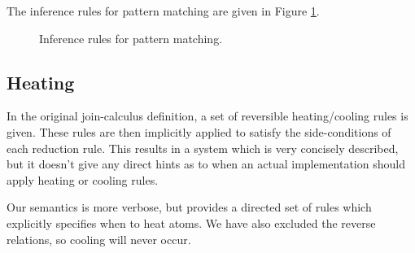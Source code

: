 The inference rules for pattern matching are given in Figure \ref{fig:rule:pat}.

\begin{figure}
\caption{Inference rules for pattern matching.} \label{fig:rule:pat}
\end{figure}

\subsection{Heating}
In the original join-calculus definition, a set of reversible heating/cooling
rules is given. These rules are then implicitly applied to satisfy the
side-conditions of each reduction rule. This results in a system which is very
concisely described, but it doesn't give any direct hints as to when an actual
implementation should apply heating or cooling rules.

Our semantics is more verbose, but provides a directed set of rules which
explicitly specifies when to heat atoms. We have also excluded the reverse
relations, so cooling will never occur.

